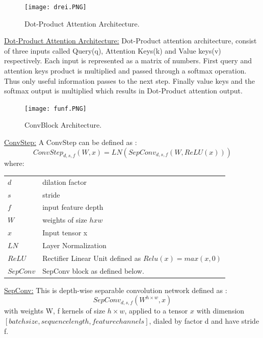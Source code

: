 \documentclass[12pt]{article}
\makeatletter
\newenvironment{conditions}
  {\par\vspace{\abovedisplayskip}\noindent\begin{tabular}{>{$}l<{$} @{${}={}$} l}}
  {\end{tabular}\par\vspace{\belowdisplayskip}}
\makeatother
\begin{document}
\begin{center}
\begin{figure}[h]
  \centering
  \begin{minipage}[b]{1.0\textwidth}
    \centering
    \texttt{[image: drei.PNG]}
      \centering
    \caption{Dot-Product Attention Architecture. \cite{KaiserGSVPJU17}}
  \end{minipage}
\end{figure}
\end{center}
\underline{Dot-Product Attention Architecture:} Dot-Product attention architecture, consist of three inputs called Query(q), Attention Keys(k) and Value keys(v) respectively. Each input is represented as a matrix of numbers. First query and attention keys product is multiplied and passed through a softmax operation. Thus only useful information passes to the next step. Finally value keys and the softmax output is multiplied which results in Dot-Product attention output.
\begin{center}
\begin{figure}[h]
  \centering
  \begin{minipage}[b]{1.0\textwidth}
    \centering
    \texttt{[image: funf.PNG]}
      \centering
    \caption{ConvBlock Architecture. \cite{KaiserGSVPJU17}}
  \end{minipage}
\end{figure}
\end{center}
\underline{ConvStep:} A ConvStep can be defined as :
\begin{equation}
ConvStep_{d,s,f}(W,x) = LN(SepConv_{d,s,f}(W,ReLU(x)))
\end{equation}
where:
\begin{conditions}
d & dilation factor \\
s & stride \\
f & input feature depth \\
W & weights of size $h x w$\\
x & Input tensor x\\
LN & Layer Normalization\\
ReLU & Rectifier Linear Unit defined as $Relu(x) = max(x,0)$\\
SepConv & SepConv block as defined below.
\end{conditions}
\underline{SepConv:} This is depth-wise separable convolution network \cite{Chollet16a} defined as :
\begin{equation}
SepConv_{d,s,f}(W^{h\times w},x) 
\end{equation}
with weights W, f kernels of size $h \times w$, applied to a tensor $x$ with dimension \\$[batchsize,sequence length, feature channels]$, dialed by factor d and have stride f. \\
\end{document}
